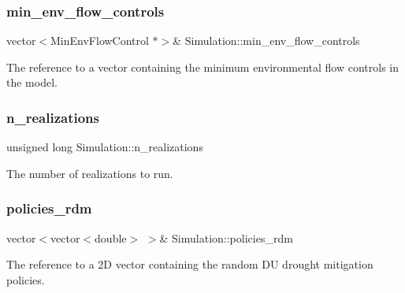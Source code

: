 \subsubsection{\texorpdfstring{min\+\_\+env\+\_\+flow\+\_\+controls}{min\_env\_flow\_controls}}
{\footnotesize\ttfamily vector$<$Min\+Env\+Flow\+Control $\ast$$>$\& Simulation\+::min\+\_\+env\+\_\+flow\+\_\+controls\hspace{0.3cm}{\ttfamily [private]}}



The reference to a vector containing the minimum environmental flow controls in the model. 

\mbox{\label{classSimulation_ab365c523e28a3af3be06e251b478e2b0}} 
\subsubsection{\texorpdfstring{n\+\_\+realizations}{n\_realizations}}
{\footnotesize\ttfamily unsigned long Simulation\+::n\+\_\+realizations\hspace{0.3cm}{\ttfamily [private]}}



The number of realizations to run. 

\mbox{\label{classSimulation_a4fd8d11506b6427577c9d8aa43932b2c}} 
\subsubsection{\texorpdfstring{policies\+\_\+rdm}{policies\_rdm}}
{\footnotesize\ttfamily vector$<$vector$<$double$>$ $>$\& Simulation\+::policies\+\_\+rdm\hspace{0.3cm}{\ttfamily [private]}}



The reference to a 2D vector containing the random DU drought mitigation policies. 

\mbox{\label{classSimulation_a7fc97bea88fee3f551d22042ae813428}} 
